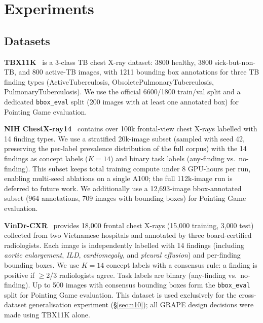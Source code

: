 \documentclass{article}
\begin{document}
\section{Experiments}
\label{sec:experiments}

\subsection{Datasets}

\textbf{TBX11K}~\cite{chen2020tbx11k} is a 3-class TB chest X-ray dataset: 3800 healthy, 3800 sick-but-non-TB, and 800 active-TB images, with 1211 bounding box annotations for three TB finding types (ActiveTuberculosis, ObsoletePulmonaryTuberculosis, PulmonaryTuberculosis). We use the official 6600/1800 train/val split and a dedicated \texttt{bbox\_eval} split (200 images with at least one annotated box) for Pointing Game evaluation.

\textbf{NIH ChestX-ray14}~\cite{wang2017chestxray14} contains over 100k frontal-view chest X-rays labelled with 14 finding types. We use a stratified 20k-image subset (sampled with seed 42, preserving the per-label prevalence distribution of the full corpus) with the 14 findings as concept labels ($K=14$) and binary task labels (any-finding vs.\ no-finding). This subset keeps total training compute under 8 GPU-hours per run, enabling multi-seed ablations on a single A100; the full 112k-image run is deferred to future work. We additionally use a 12,693-image bbox-annotated subset (964 annotations, 709 images with bounding boxes) for Pointing Game evaluation.

\textbf{VinDr-CXR}~\cite{vindrcxr2022} provides 18{,}000 frontal chest X-rays (15{,}000 training, 3{,}000 test) collected from two Vietnamese hospitals and annotated by three board-certified radiologists.
Each image is independently labelled with 14 findings (including \emph{aortic enlargement}, \emph{ILD}, \emph{cardiomegaly}, and \emph{pleural effusion}) and per-finding bounding boxes.
We use $K=14$ concept labels with a consensus rule: a finding is positive if $\geq$2/3 radiologists agree.
Task labels are binary (any-finding vs.\ no-finding).
Up to 500 images with consensus bounding boxes form the \texttt{bbox\_eval} split for Pointing Game evaluation.
This dataset is used exclusively for the cross-dataset generalisation experiment (§\ref{sec:n10}); all GRAPE design decisions were made using TBX11K alone.
\label{sec:datasets}
\end{document}
